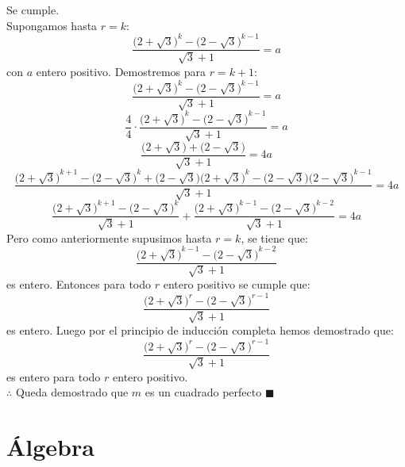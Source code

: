 \documentclass{book}
\begin{document}
\begin{enumerate}
        Se cumple.\\
        Supongamos hasta $r=k$:\\
        $$\frac{{\big(2+\sqrt{3}\big)}^{k}-{\big(2-\sqrt{3}\big)}^{k-1}}{\sqrt{3}+1}=a$$
        con $a$ entero positivo.
        Demostremos para $r=k+1$:
        $$\frac{{\big(2+\sqrt{3}\big)}^{k}-{\big(2-\sqrt{3}\big)}^{k-1}}{\sqrt{3}+1}=a$$
        $$\frac{4}{4}\cdot\frac{{\big(2+\sqrt{3}\big)}^{k}-{\big(2-\sqrt{3}\big)}^{k-1}}{\sqrt{3}+1}=a$$
        $$\frac{\big(2+\sqrt{3}\big)+\big(2-\sqrt{3}\big)}{\sqrt{3}+1}=4a$$
        $$\frac{{\big(2+\sqrt{3}\big)}^{k+1}-{\big(2-\sqrt{3}\big)}^{k}+\big(2-\sqrt{3}\big){\big(2+\sqrt{3}\big)}^{k}-\big(2-\sqrt{3}\big){\big(2-\sqrt{3}\big)}^{k-1}}{\sqrt{3}+1}=4a$$
        $$\frac{{\big(2+\sqrt{3}\big)}^{k+1}-{\big(2-\sqrt{3}\big)}^{k}}{\sqrt{3}+1}+\frac{{\big(2+\sqrt{3}\big)}^{k-1}-{\big(2-\sqrt{3}\big)}^{k-2}}{\sqrt{3}+1}=4a$$
        Pero como anteriormente supusimos hasta $r=k$, se tiene que:
        $$\frac{{\big(2+\sqrt{3}\big)}^{k-1}-{\big(2-\sqrt{3}\big)}^{k-2}}{\sqrt{3}+1}$$
        es entero. Entonces para todo $r$ entero positivo se cumple que:
        $$\frac{{\big(2+\sqrt{3}\big)}^{r}-{\big(2-\sqrt{3}\big)}^{r-1}}{\sqrt{3}+1}$$
        es entero. Luego por el principio de inducción completa hemos demostrado que:
        $$\frac{{\big(2+\sqrt{3}\big)}^{r}-{\big(2-\sqrt{3}\big)}^{r-1}}{\sqrt{3}+1}$$
        es entero para todo $r$ entero positivo.\\
        $\therefore$ Queda demostrado que $m$ es un cuadrado perfecto $\blacksquare$
    \end{enumerate}


    \chapter{Álgebra}
\end{document}
